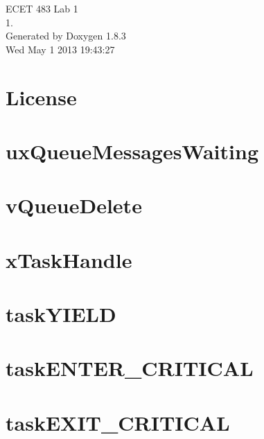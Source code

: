 \documentclass{book}
\begin{document}
\hypersetup{pageanchor=false,citecolor=blue}
\begin{titlepage}
\vspace*{7cm}
\begin{center}
{\Large E\-C\-E\-T 483 Lab 1 \\[1ex]\large 1. }\\
\vspace*{1cm}
{\large Generated by Doxygen 1.8.3}\\
\vspace*{0.5cm}
{\small Wed May 1 2013 19:43:27}\\
\end{center}
\end{titlepage}
\clearemptydoublepage
{}
\tableofcontents
\clearemptydoublepage
{}
\hypersetup{pageanchor=true,citecolor=blue}
\chapter{License}
\label{License}
\hypertarget{License}{}

\chapter{ux\-Queue\-Messages\-Waiting}
\label{uxQueueMessagesWaiting}
\hypertarget{uxQueueMessagesWaiting}{}

\chapter{v\-Queue\-Delete}
\label{vQueueDelete}
\hypertarget{vQueueDelete}{}

\chapter{x\-Task\-Handle}
\label{xTaskHandle}
\hypertarget{xTaskHandle}{}

\chapter{task\-Y\-I\-E\-L\-D}
\label{taskYIELD}
\hypertarget{taskYIELD}{}

\chapter{task\-E\-N\-T\-E\-R\-\_\-\-C\-R\-I\-T\-I\-C\-A\-L}
\label{taskENTER_CRITICAL}
\hypertarget{taskENTER_CRITICAL}{}

\chapter{task\-E\-X\-I\-T\-\_\-\-C\-R\-I\-T\-I\-C\-A\-L}
\label{taskEXIT_CRITICAL}
\hypertarget{taskEXIT_CRITICAL}{}

\end{document}
